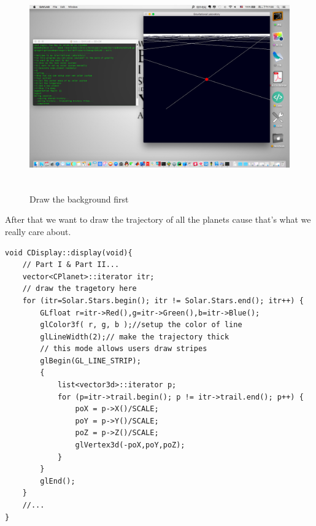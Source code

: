 \documentclass[12pt]{article}
\begin{document}
\begin{figure}[H]
\centering
\includegraphics[width=14.4cm,height=9cm]{background.png}
\caption{Draw the background first}
\end{figure}

\clearpage
 
After that we want to draw the trajectory of all the planets cause that's what we really care about.
\begin{lstlisting}[caption=display() Part III drawing the trajectory]
void CDisplay::display(void){
    // Part I & Part II...
    vector<CPlanet>::iterator itr;
    // draw the tragetory here
    for (itr=Solar.Stars.begin(); itr != Solar.Stars.end(); itr++) {
        GLfloat r=itr->Red(),g=itr->Green(),b=itr->Blue();
        glColor3f( r, g, b );//setup the color of line
        glLineWidth(2);// make the trajectory thick 
        // this mode allows users draw stripes 
        glBegin(GL_LINE_STRIP);
        {
            list<vector3d>::iterator p;
            for (p=itr->trail.begin(); p != itr->trail.end(); p++) {
                poX = p->X()/SCALE;
                poY = p->Y()/SCALE;
                poZ = p->Z()/SCALE;
                glVertex3d(-poX,poY,poZ);
            }
        }
        glEnd();
    }
    //...
}
\end{lstlisting}
\clearpage
\end{document}

